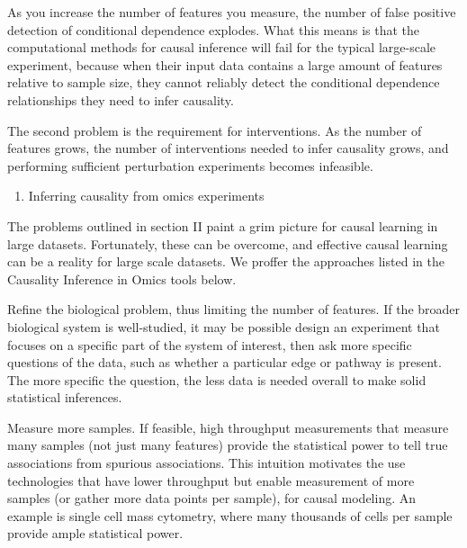\documentclass[]{article}
\begin{document}
As you increase the number of features you measure, the number of false
positive detection of conditional dependence explodes. What this means
is that the computational methods for causal inference will fail for the
typical large-scale experiment, because when their input data contains a
large amount of features relative to sample size, they cannot reliably
detect the conditional dependence relationships they need to infer
causality.

The second problem is the requirement for interventions. As the number
of features grows, the number of interventions needed to infer causality
grows, and performing sufficient perturbation experiments becomes
infeasible.

\begin{enumerate}
\def\labelenumi{\Roman{enumi}.}
\setcounter{enumi}{2}
\itemsep1pt\parskip0pt
\item
  Inferring causality from omics experiments
\end{enumerate}

The problems outlined in section II paint a grim picture for causal
learning in large datasets. Fortunately, these can be overcome, and
effective causal learning can be a reality for large scale datasets. We
proffer the approaches listed in the Causality Inference in Omics tools
below.

Refine the biological problem, thus limiting the number of features. If
the broader biological system is well-studied, it may be possible design
an experiment that focuses on a specific part of the system of interest,
then ask more specific questions of the data, such as whether a
particular edge or pathway is present. The more specific the question,
the less data is needed overall to make solid statistical inferences.

Measure more samples. If feasible, high throughput measurements that
measure many samples (not just many features) provide the statistical
power to tell true associations from spurious associations. This
intuition motivates the use technologies that have lower throughput but
enable measurement of more samples (or gather more data points per
sample), for causal modeling. An example is single cell mass cytometry,
where many thousands of cells per sample provide ample statistical
power.
\end{document}
